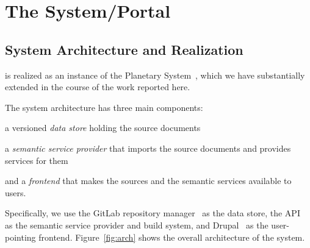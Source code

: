\section{The \sys System/Portal}\label{sec:mathhub}

\subsection{System Architecture and Realization}\label{sec:arch}

\sys is realized as an instance of the Planetary System~\cite{Kohlhase:ppte12}, which we
have substantially extended in the course of the work reported here.


The system architecture has three main components: 
\begin{compactenum}[\em i\rm)]
 \item a versioned \emph{data store} holding the source documents
 \item a \emph{semantic service provider} that imports the source documents and provides services for them 
 \item and a \emph{frontend} that makes the sources and the semantic services available to users.
\end{compactenum}
Specifically, we use the GitLab repository manager~\cite{GitLab:on} as the data store, the
\mmt API~\cite{Rabe:MAGMS13,uniformal:on} as the semantic service provider and build
system, and Drupal~\cite{drupal:on} as the user-pointing frontend.  Figure~\ref{fig:arch}
shows the overall architecture of the \sys system.

